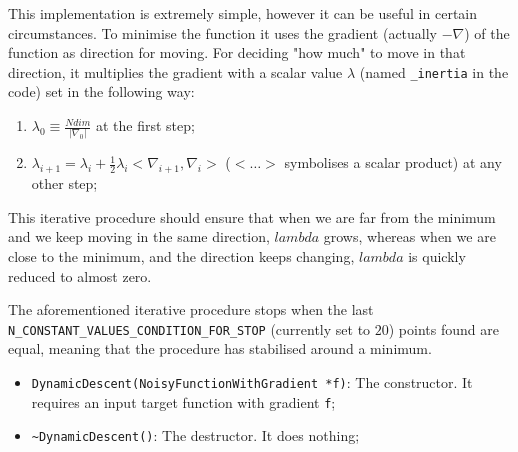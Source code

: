 \documentclass[11pt,a4paper,twoside]{article}
\begin{document}
This implementation is extremely simple, however it can be useful in certain circumstances. To minimise the function it uses the gradient (actually $-\nabla$) of the function as direction for moving. For deciding "how much" to move in that direction, it multiplies the gradient with a scalar value $\lambda$ (named \verb+_inertia+ in the code) set in the following way:
\begin{enumerate}
\item $\lambda_0 \equiv \frac{Ndim}{\left| \nabla_0 \right|}$ at the first step;
\item $\lambda_{i+1} = \lambda_i + \frac{1}{2} \lambda_i <\nabla_{i+1}, \nabla_i>$ ($< \dots >$ symbolises a scalar product) at any other step;
\end{enumerate}
This iterative procedure should ensure that when we are far from the minimum and we keep moving in the same direction, $lambda$ grows, whereas when we are close to the minimum, and the direction keeps changing, $lambda$ is quickly reduced to almost zero.

The aforementioned iterative procedure stops when the last \verb+N_CONSTANT_VALUES_CONDITION_FOR_STOP+ (currently set to $20$) points found are equal, meaning that the procedure has stabilised around a minimum.

\begin{itemize}
   \item \verb+DynamicDescent(NoisyFunctionWithGradient *f)+: The constructor. It requires an input target function with gradient \verb+f+;
   \item \verb+~DynamicDescent()+: The destructor. It does nothing;
\end{itemize}




\printindex
\end{document}
